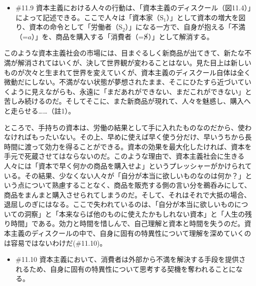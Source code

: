 \begin{note}{}
  \begin{itemize}
    \tightlist
    \item{\#11.9}
      資本主義における人々の行動は、「\mbox{資本主義のディスクール}（図11.4）」によって記述できる。ここで人々は「資本家（$\textrm{S}_1$）」として資本の増大を図り、資本の命令として「労働者（$\textrm{S}_2$）」になる一方で、自身が抱える「不満（=$a$）」を、商品を購入する「消費者（=$\cancel{\textrm{S}}$）」として解消する。
  \end{itemize}
\end{note}

このような資本主義社会の市場には、目まぐるしく新商品が出てきて、新たな不満が解消されてはいくが、決して世界観が変わることはない。見た目上は新しいものが次々と生まれて世界を変えていくが、\mbox{資本主義のディスクール}自体は全く微動だにしない。不満がない状態が夢想されたまま、そこにひたすら近づいていくように見えながらも、永遠に「まだあれができない、まだこれができない」と苦しみ続けるのだ。そしてそこに、また新商品が現れて、人々を魅惑し、購入へと走らせる\ldots\ldots（註1）。

ところで、手持ちの資本は、労働の結果として手に入れたものなのだから、使わなければもったいない。その上、早めに使えば早く使う分だけ、早いうちから長時間に渡って効力を得ることができる。資本の効果を最大化したければ、資本を手元で死蔵させてはならないのだ。このような理由で、資本主義社会に生きる人々には「資本で早く何かの商品を購入せよ」というプレッシャーがかけられている。その結果、少なくない人々が「自分が本当に欲しいものなのは何か？」という点について熟慮することなく、商品を販売する側の言い分を鵜呑みにして、商品をまんまと購入させられてしまうのだ。そして、それはそれで大抵の場合、退屈しのぎにはなる。ここで失われているのは、「自分が本当に欲しいものについての洞察」と「本来ならば他のものに使えたかもしれない資本」と「人生の残り時間」である。効力と時間を惜しんで、自己理解と資本と時間を失うのだ。\mbox{資本主義のディスクール}の中で、自身に固有の特異性について理解を深めていくのは容易ではないわけだ(\#11.10)。

\begin{note}{}
  \begin{itemize}
    \tightlist
    \item{\#11.10}
      資本主義において、消費者は外部から不満を解決する手段を提供されるため、自身に固有の特異性について思考する契機を奪われることになる。
  \end{itemize}
\end{note}

